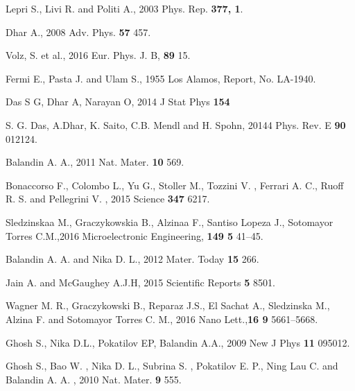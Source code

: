 \documentclass[12pt]{article}
\begin{document}
\begin{thebibliography}{99}

 Lepri S., Livi R. and Politi A., 2003  Phys. Rep. {\bf 377, 1}.

 Dhar A., 2008 Adv. Phys. {\bf 57} 457.

Volz, S. et al., 2016 Eur. Phys. J. B, {\bf 89} 15.

 Fermi E., Pasta J. and Ulam S., 1955 Los Alamos, Report, No. LA-1940.

 Das S G, Dhar A, Narayan O, 2014 J Stat Phys  {\bf 154}

 S. G. Das, A.Dhar, K. Saito, C.B. Mendl and H. Spohn, 20144 Phys. Rev. E {\bf 90} 012124.
 
 Balandin A. A., 2011 Nat. Mater. {\bf 10} 569.

 Bonaccorso F., Colombo L., Yu G., Stoller M., Tozzini V. , Ferrari A. C., Ruoff R. S. and Pellegrini V. , 2015 Science {\bf 347} 6217.

 Sledzinskaa M., Graczykowskia B., Alzinaa F., Santiso Lopeza J., Sotomayor Torres C.M.,2016  Microelectronic Engineering, {\bf 149 5} 41–45.

 Balandin A. A. and Nika D. L., 2012 Mater. Today {\bf 15} 266.

 Jain A. and McGaughey A.J.H, 2015 Scientific Reports {\bf  5 } 8501.

 Wagner M. R., Graczykowski B., Reparaz J.S., El Sachat A., Sledzinska M., Alzina F. and Sotomayor Torres C. M., 2016 Nano Lett.,{\bf 16 9} 5661–5668.

 Ghosh S., Nika D.L., Pokatilov EP, Balandin A.A., 2009 New J Phys {\bf 11} 095012.

 Ghosh S., Bao W. , Nika D. L., Subrina S. , Pokatilov E. P.,
Ning Lau C. and Balandin A. A. , 2010 Nat. Mater. {\bf 9} 555.
   

\end{thebibliography}
\end{document}
